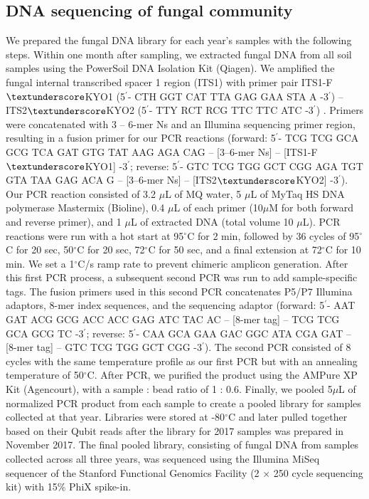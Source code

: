 \subsection*{DNA sequencing of fungal community}
We prepared the fungal DNA library for each year's samples with the following steps.
Within one month after sampling, we extracted fungal DNA from all soil samples using the PowerSoil DNA Isolation Kit (Qiagen). 
We amplified the fungal internal transcribed spacer 1 region (ITS1) with primer pair ITS1-F$\textunderscore$KYO1 (5$^\prime$- CTH GGT CAT TTA GAG GAA STA A -3$^\prime$) -- ITS2$\textunderscore$KYO2 (5$^\prime$- TTY RCT RCG TTC TTC ATC -3$^\prime$) \citep{Toju2012}. Primers were concatenated with 3 -- 6-mer Ns \citep{Lundberg2013} and an Illumina sequencing primer region, resulting in a fusion primer for our PCR reactions (forward: 5$^\prime$- TCG TCG GCA GCG TCA GAT GTG TAT AAG AGA CAG -- [3--6-mer Ns] -- [ITS1-F$\textunderscore$KYO1] -3$^\prime$; reverse: 5$^\prime$- GTC TCG TGG GCT CGG AGA TGT GTA TAA GAG ACA G -- [3--6-mer Ns] -- [ITS2$\textunderscore$KYO2] -3$^\prime$). 
Our PCR reaction consisted of 3.2 $\mu$L of MQ water, 5 $\mu$L of MyTaq HS DNA polymerase Mastermix (Bioline), 0.4 $\mu$L of each primer (10$\mu$M for both forward and reverse primer), and 1 $\mu$L of extracted DNA (total volume 10 $\mu$L). PCR reactions were run with a hot start at 95$^{\circ}$C for 2 min, followed by 36 cycles of 95$^{\circ}$C for 20 sec, 50$^{\circ}$C for 20 sec, 72$^{\circ}$C for 50 sec, and a final extension at 72$^{\circ}$C for 10 min. We set a 1$^{\circ}$C/s ramp rate to prevent chimeric amplicon generation. 
After this first PCR process, a subsequent second PCR was run to add sample-specific tags. The fusion primers used in this second PCR concatenates P5/P7 Illumina adaptors, 8-mer index sequences, and the sequencing adaptor \citep{Hamady2008} (forward: 5$^\prime$- AAT GAT ACG GCG ACC ACC GAG ATC TAC AC -- [8-mer tag] -- TCG TCG GCA GCG TC -3$^\prime$; reverse: 5$^\prime$- CAA GCA GAA GAC GGC ATA CGA GAT -- [8-mer tag] -- GTC TCG TGG GCT CGG -3$^\prime$). The second PCR consisted of 8 cycles with the same temperature profile as our first PCR but with an annealing temperature of 50$^{\circ}$C. 
After PCR, we purified the product using the AMPure XP Kit (Agencourt), with a sample : bead ratio of 1 : 0.6. Finally, we pooled 5$\mu$L of normalized PCR product from each sample to create a pooled library for samples collected at that year. 
Libraries were stored at -80$^{\circ}$C and later pulled together based on their Qubit reads after the library for 2017 samples was prepared in November 2017.
The final pooled library, consisting of fungal DNA from samples collected across all three years, was sequenced using the Illumina MiSeq sequencer of the Stanford Functional Genomics Facility (2 $\times$ 250 cycle sequencing kit) with 15$\%$ PhiX spike-in.
\par


